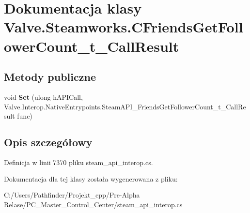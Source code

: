 \hypertarget{class_valve_1_1_steamworks_1_1_c_friends_get_follower_count__t___call_result}{}\section{Dokumentacja klasy Valve.\+Steamworks.\+C\+Friends\+Get\+Follower\+Count\+\_\+t\+\_\+\+Call\+Result}
\label{class_valve_1_1_steamworks_1_1_c_friends_get_follower_count__t___call_result}
\subsection*{Metody publiczne}
\begin{DoxyCompactItemize}
\item 
\mbox{\label{class_valve_1_1_steamworks_1_1_c_friends_get_follower_count__t___call_result_af8b3563a8ae33e47113228a2562ea88d}} 
void {\bfseries Set} (ulong h\+A\+P\+I\+Call, Valve.\+Interop.\+Native\+Entrypoints.\+Steam\+A\+P\+I\+\_\+\+Friends\+Get\+Follower\+Count\+\_\+t\+\_\+\+Call\+Result func)
\end{DoxyCompactItemize}


\subsection{Opis szczegółowy}


Definicja w linii 7370 pliku steam\+\_\+api\+\_\+interop.\+cs.



Dokumentacja dla tej klasy została wygenerowana z pliku\+:\begin{DoxyCompactItemize}
\item 
C\+:/\+Users/\+Pathfinder/\+Projekt\+\_\+cpp/\+Pre-\/\+Alpha Relase/\+P\+C\+\_\+\+Master\+\_\+\+Control\+\_\+\+Center/steam\+\_\+api\+\_\+interop.\+cs\end{DoxyCompactItemize}
